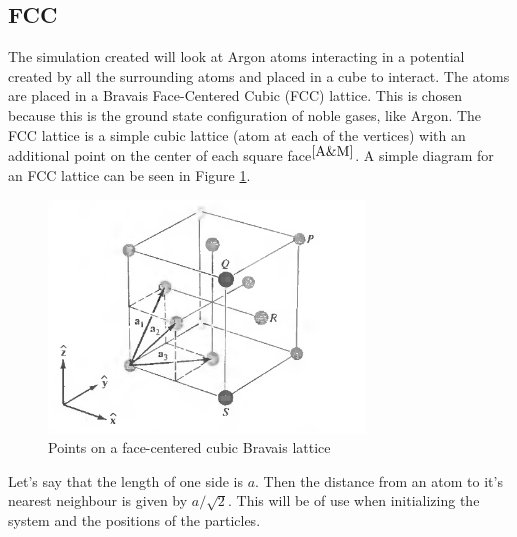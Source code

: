 \documentclass[letterpaper,12pt]{article}
\numberwithin{equation}{subsection}
\begin{document}
\subsection{FCC}
\indent The simulation created will look at Argon atoms interacting in a potential created by all the surrounding atoms and placed in a cube to interact. The atoms are placed in a Bravais Face-Centered Cubic (FCC) lattice. This is chosen because this is the ground state configuration of noble gases, like Argon. The FCC lattice is a simple cubic lattice (atom at each of the vertices) with an additional point on the center of each square face$ ^{\cite{A&M}}$. A simple diagram for an FCC lattice can be seen in Figure \ref{fig:FCC}.
\begin{figure}[H]
        \centering
        \caption{Points on a face-centered cubic Bravais lattice \label{fig:FCC}}
                \centering
                \includegraphics[width=0.75\textwidth]{fcc.png}
\end{figure}
Let's say that the length of one side is $a$. Then the distance from an atom to it's nearest neighbour is given by $a/ \sqrt{2}$. This will be of use when initializing the system and the positions of the particles.
\end{document}
